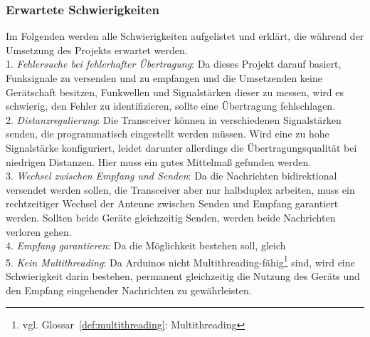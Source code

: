 \documentclass[a4paper, 11pt]{scrartcl}
\begin{document}
\subsubsection{Erwartete Schwierigkeiten}
Im Folgenden werden alle Schwierigkeiten aufgelistet und erklärt, die während der Umsetzung des Projekts erwartet werden.
\\
1. \textit{Fehlersuche bei fehlerhafter Übertragung}: Da dieses Projekt darauf basiert, Funksignale zu versenden und zu empfangen und die Umsetzenden keine Gerätschaft
besitzen, Funkwellen und Signalstärken dieser zu messen, wird es schwierig, den Fehler zu identifizieren, sollte eine Übertragung fehlschlagen.
\\
2. \textit{Distanzregulierung}: Die Transceiver können in verschiedenen Signalstärken senden, die programmatisch eingestellt werden müssen.
Wird eine zu hohe Signalstärke konfiguriert, leidet darunter allerdings die Übertragungsqualität bei niedrigen Distanzen. Hier muss ein gutes Mittelmaß
gefunden werden.
\\
3. \textit{Wechsel zwischen Empfang und Senden}: Da die Nachrichten bidirektional versendet werden sollen, die Transceiver aber nur halbduplex arbeiten,
muss ein rechtzeitiger Wechsel der Antenne zwischen Senden und Empfang garantiert werden. Sollten beide Geräte gleichzeitig Senden, werden beide Nachrichten
verloren gehen.
\\
4. \textit{Empfang garantieren}: Da die Möglichkeit bestehen soll, gleich 
\\
5. \textit{Kein Multithreading}: Da Arduinos nicht Multithreading-fähig\footnote{vgl. Glossar~\ref{def:multithreading}: Multithreading} sind, wird eine Schwierigkeit
darin bestehen, permanent gleichzeitig die Nutzung des Geräts und den Empfang eingehender Nachrichten zu gewährleisten.
\end{document}
